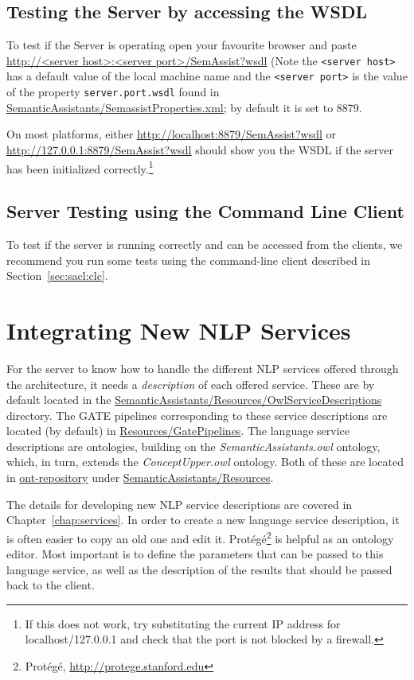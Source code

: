 \subsection{Testing the Server by accessing the WSDL}
To test if the Server is operating open your favourite browser and
paste \url{http://<server host>:<server port>/SemAssist?wsdl} (Note
the \texttt{<server host>} has a default value of the local machine
name and the \texttt{<server port>} is the value of the property
\texttt{server.port.wsdl} found in
\url{SemanticAssistants/SemassistProperties.xml}; by default it is set
to 8879.

On most platforms, either \url{http://localhost:8879/SemAssist?wsdl}
or \url{http://127.0.0.1:8879/SemAssist?wsdl} should show you the WSDL
if the server has been initialized correctly.\footnote{If this does
  not work, try substituting the current IP address for
  localhost/127.0.0.1 and check that the port is not blocked by a
  firewall.}

\subsection{Server Testing using the Command Line Client}
To test if the server is running correctly and can be accessed from
the clients, we recommend you run some tests using the command-line
client described in Section~\ref{sec:sacl:clc}.


\section{Integrating New NLP Services}
\label{sec:nlpservices}
For the server to know how to handle the different NLP services
offered through the architecture, it needs a \emph{description} of
each offered service. These are by default located in the
\url{SemanticAssistants/Resources/OwlServiceDescriptions}
directory. The GATE pipelines corresponding to these service
descriptions are located (by default) in
\url{Resources/GatePipelines}. The language service descriptions are
ontologies, building on the \emph{SemanticAssistants.owl} ontology,
which, in turn, extends the \emph{ConceptUpper.owl} ontology. Both of
these are located in \url{ont-repository} under
\url{SemanticAssistants/Resources}.

The details for developing new NLP service descriptions are covered in
Chapter~\ref{chap:services}.  In order to create a new language
service description, it is often easier to copy an old one and edit
it. Prot\'{e}g\'{e}\footnote{Prot\'{e}g\'{e},
  \url{http://protege.stanford.edu}} is helpful as an ontology
editor. Most important is to define the parameters that can be passed
to this language service, as well as the description of the results
that should be passed back to the client.

